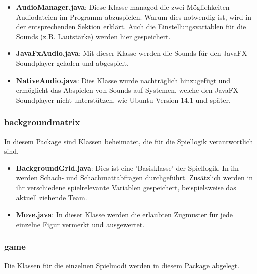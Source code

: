 \documentclass[12pt,a4paper]{article}
\begin{document}
\begin{itemize}
	\item{\textbf{AudioManager.java}: Diese Klasse managed die zwei Möglichkeiten Audiodateien im Programm abzuspielen. Warum dies notwendig ist, wird in der entsprechenden Sektion erklärt. %
Auch die Einstellungsvariablen für die Sounds (z.B. Lautstärke) werden hier gespeichert. }
	
	\item{\textbf{JavaFxAudio.java}: Mit dieser Klasse werden die Sounds für den JavaFX - Soundplayer geladen und abgespielt. }	
	
	\item{\textbf{NativeAudio.java}: Dies Klasse wurde nachträglich hinzugefügt und ermöglicht das Abspielen von Sounds auf Systemen, welche den JavaFX-Soundplayer nicht unterstützen, wie Ubuntu Version 14.1 und später.}
	
\end{itemize}

\subsubsection{backgroundmatrix}

In diesem Package sind Klassen beheimatet, die für die Spiellogik verantwortlich sind.

\begin{itemize}
	\item{\textbf{BackgroundGrid.java}: Dies ist eine 'Basisklasse' der Spiellogik. In ihr werden Schach- und Schachmattabfragen durchgeführt. Zusätzlich werden in ihr verschiedene spielrelevante Variablen gespeichert, beispielsweise das aktuell ziehende Team.}
	
	\item{\textbf{Move.java}: In dieser Klasse werden die erlaubten Zugmuster für jede einzelne Figur vermerkt und ausgewertet.  }

\end{itemize}
 
\subsubsection{game}

Die Klassen für die einzelnen Spielmodi werden in diesem Package abgelegt. 
\end{document}
